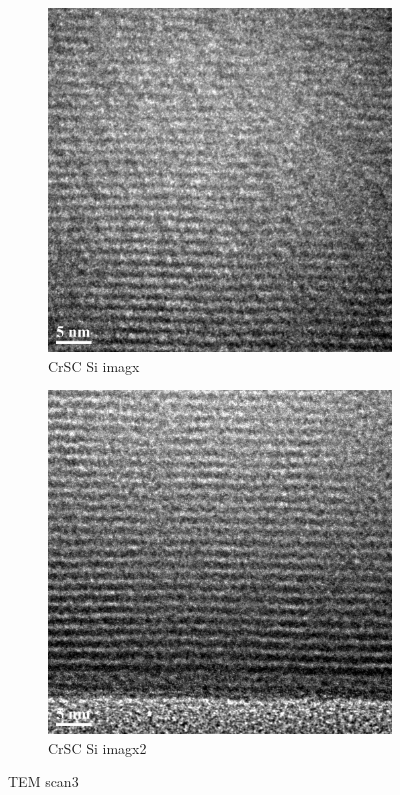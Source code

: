 \begin{figure}[h!]
	\centering
	\begin{subfigure}[b]{0.45\textwidth}
		\includegraphics[width=\textwidth]{./Images/TEM/CrSC_Si_imagx}
		\caption{CrSC Si imagx}
		\label{fig:CrSC_Si_imagx}
	\end{subfigure}
	\begin{subfigure}[b]{0.45\textwidth}
		\includegraphics[width=\textwidth]{./Images/TEM/CrSC_Si_imagx2}
		\caption{CrSC Si imagx2}
		\label{fig:CrSC_Si_imagx2}
	\end{subfigure}

	\caption{TEM scan3}
	\label{fig:TEM scan3}
\end{figure}